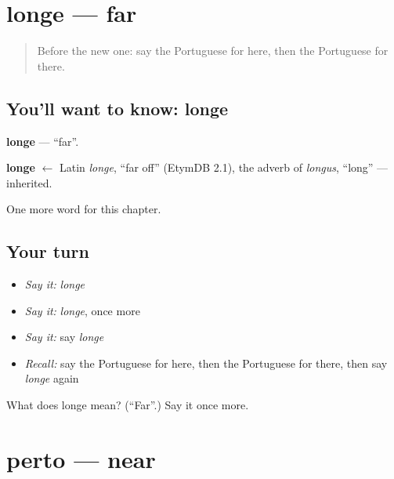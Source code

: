 \section[longe]{longe — far}

\label{lesson:PT-C72-longe}



\begin{quote}
Before the new one: say the Portuguese for here, then the Portuguese for there.
\end{quote}

\subsection*{You'll want to know: longe}
\textbf{longe} — \textquotedblleft{}far\textquotedblright{}.

\begin{cousinweb}
\textbf{longe} $\leftarrow$ Latin \emph{longe}, \textquotedblleft{}far off\textquotedblright{} (EtymDB 2.1), the adverb of \emph{longus}, \textquotedblleft{}long\textquotedblright{} — inherited.
\end{cousinweb}

\begin{grammarlens}[title={What you've built}]
One more word for this chapter.
\end{grammarlens}

\subsection*{Your turn}
\begin{itemize}
\raggedright
  \item \emph{Say it:} \emph{longe}
  \item \emph{Say it:} \emph{longe}, once more
  \item \emph{Say it:} say \emph{longe}
  \item \emph{Recall:} say the Portuguese for here, then the Portuguese for there, then say \emph{longe} again
\end{itemize}

\begin{tcolorbox}[breakable,colback=teal!4,colframe=teal!35!black,title={Before you move on}]
What does longe mean? (\textquotedblleft{}Far\textquotedblright{}.) Say it once more.
\end{tcolorbox}
\section[perto]{perto — near}

